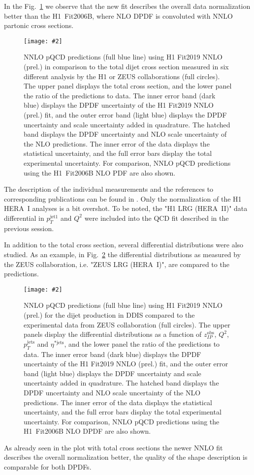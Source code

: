 \documentclass{PoS}
\newcommand{\IP}{I\!\!P}
\newcommand{\includegraphicss}[2][]{\texttt{[image: \#2]}}
\begin{document}
In the Fig.~\ref{figTotalXsecs} we observe that the new fit describes the overall data normalization better than the H1~Fit2006B, where NLO DPDF is convoluted with NNLO partonic cross sections.
%
\begin{figure}[h]
\centering
\includegraphicss[trim={0cm 1.7cm 0 0.7cm},clip,width=.6\textwidth]{{{plots/H1prelim-19-013.fig3}}}
\caption{ NNLO pQCD predictions (full blue line) using H1 Fit2019 NNLO (prel.) in comparison to the total dijet cross section measured in six different analysis by the H1 or ZEUS collaborations (full circles). The upper panel displays the total cross section, and the lower panel the ratio of the predictions to data. The inner error band (dark blue) displays the DPDF uncertainty of the H1 Fit2019 NNLO (prel.) fit, and the outer error band (light blue) displays the DPDF uncertainty and scale uncertainty added in quadrature. The hatched band displays the DPDF uncertainty and NLO scale uncertainty of the NLO predictions. The inner error of the data displays the statistical uncertainty, and the full error bars display the total experimental uncertainty. For comparison, NNLO pQCD predictions using the H1~Fit2006B NLO PDF are also shown.}
\label{figTotalXsecs}
\end{figure}
%
The description of the individual measurements and the references to corresponding publications can be found in \cite{Britzger:2018zvv}.
Only the normalization of the H1 HERA~I analyses is a bit overshot.
To be noted, the "H1 LRG (HERA~II)" data differential in $p_T^{\mathrm{jet}1}$ and $Q^2$ were included into the QCD fit described in the previous session.

In addition to the total cross section, several differential distributions were also studied.
As an example, in Fig.~\ref{figZEUSdiff} the differential distributions as measured by the ZEUS collaboration, i.e. "ZEUS LRG (HERA~I)", are compared to the predictions.
\begin{figure}[h]
\centering
\includegraphicss[trim={0cm 0.3cm 0 0.3cm},clip,width=.8\textwidth]{{{plots/H1prelim-19-013.fig7}}}
\caption{ NNLO pQCD predictions (full blue line) using H1 Fit2019 NNLO (prel.) for the dijet production in DDIS compared to the experimental data from ZEUS collaboration (full circles). The upper panels display the differential distributions as a function of $z_{\IP}^\mathrm{obs}$, $Q^2$, $p_T^\mathrm{jets}$ and $\eta^{*\mathrm{jets}}$, and the lower panel the ratio of the predictions to data. The inner error band (dark blue) displays the DPDF uncertainty of the H1 Fit2019 NNLO (prel.) fit, and the outer error band (light blue) displays the DPDF uncertainty and scale uncertainty added in quadrature. The hatched band displays the DPDF uncertainty and NLO scale uncertainty of the NLO predictions. The inner error of the data displays the statistical uncertainty, and the full error bars display the total experimental uncertainty. For comparison, NNLO pQCD predictions using the H1~Fit2006B NLO DPDF are also shown.}
\label{figZEUSdiff}
\end{figure}
As already seen in the plot with total cross sections the newer NNLO fit describes the overall normalization better, the quality of the shape description is comparable for both DPDFs.
\end{document}
